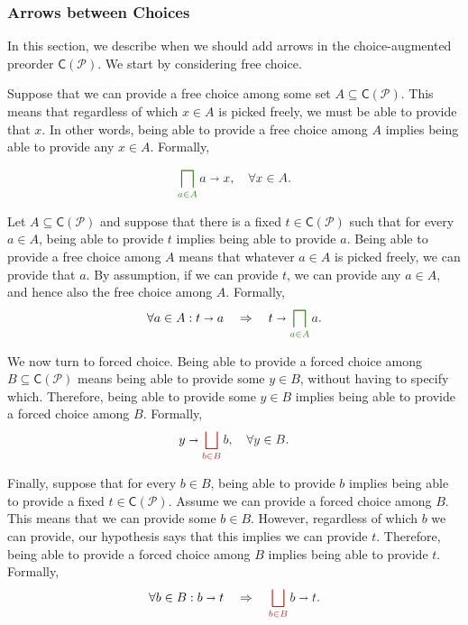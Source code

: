 \documentclass[12pt]{article}
\theoremstyle{definition}
\theoremstyle{plain}
\theoremstyle{plain}
\theoremstyle{plain}
\theoremstyle{plain}
\theoremstyle{remark}
\theoremstyle{remark}
\newcommand{\mc}[1]{\mathcal{#1}}
\newcommand{\sub}{\subseteq}
\newcommand{\cbigsqcap}[1]{\color{OliveGreen}\bigsqcap_{#1}\color{Black}}
\newcommand{\cbigsqcup}[1]{\color{BrickRed}\bigsqcup_{#1}\color{Black}}
\begin{document}
\subsubsection{Arrows between Choices}\label{sec:intr free}
In this section, we describe when we should add arrows in the choice-augmented preorder $\mathsf{C}(\mc{P})$. We start by considering free choice.

Suppose that we can provide a free choice among some set $A \sub \mathsf{C}(\mc{P})$. This means that regardless of which $x \in A$ is picked freely, we must be able to provide that $x$. In other words, being able to provide a free choice among $A$ implies being able to provide any $x \in A$. Formally,


\begin{equation}\label{eq:meet 1}
	\cbigsqcap{a \in A} a \shortrightarrow x, \quad \forall x \in A.
\end{equation}

Let $A \sub \mathsf{C}(\mc{P})$ and suppose that there is a fixed $t \in \mathsf{C}(\mc{P})$ such that for every $a \in A$, being able to provide $t$ implies being able to provide $a$. Being able to provide a free choice among $A$ means that whatever $a \in A$ is picked freely, we can provide that $a$. By assumption, if we can provide $t$, we can provide any $a \in A$, and hence also the free choice among $A$. Formally,
\begin{equation}\label{eq:meet 2}
	\forall a \in A : t \shortrightarrow a  \quad \Rightarrow \quad t \shortrightarrow 	\cbigsqcap{a \in A} a.
\end{equation}

We now turn to forced choice. Being able to provide a forced choice among $B \sub \mathsf{C}(\mc{P})$ means being able to provide some $y \in B$, without having to specify which. Therefore, being able to provide some $y \in B$ implies being able to provide a forced choice among $B$. Formally,
\begin{equation}\label{eq:join 1}
y \shortrightarrow \cbigsqcup{b \in B} b, \quad \forall y \in B.
\end{equation}

Finally, suppose that for every $b \in B$, being able to provide $b$ implies being able to provide a fixed $t \in \mathsf{C}(\mc{P})$. Assume we can provide a forced choice among $B$. This means that we can provide some $b \in B$. However, regardless of which $b$ we can provide, our hypothesis says that this implies we can provide $t$. Therefore, being able to provide a forced choice among $B$ implies being able to provide $t$. Formally, 
\begin{equation}\label{eq:join 2}
\forall b \in B : b \shortrightarrow t  \quad \Rightarrow \quad  \cbigsqcup{b \in B} b \shortrightarrow t.
\end{equation}
\end{document}
